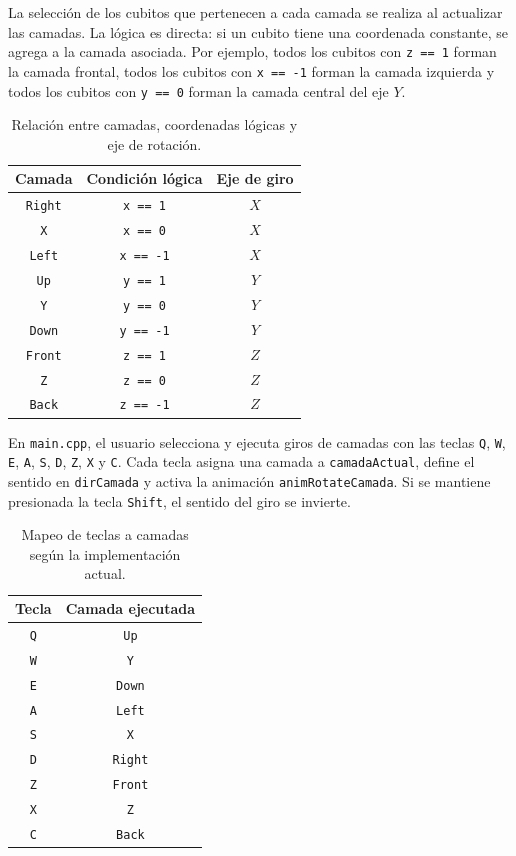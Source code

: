 \documentclass[12pt,a4paper]{article}
\begin{document}
La selección de los cubitos que pertenecen a cada camada se realiza al actualizar las camadas. La lógica es directa: si un cubito tiene una coordenada constante, se agrega a la camada asociada. Por ejemplo, todos los cubitos con \texttt{z == 1} forman la camada frontal, todos los cubitos con \texttt{x == -1} forman la camada izquierda y todos los cubitos con \texttt{y == 0} forman la camada central del eje $Y$.

\begin{table}[H]
\centering
\begin{tabular}{|c|c|c|}
\hline
\textbf{Camada} & \textbf{Condición lógica} & \textbf{Eje de giro} \\ \hline
\texttt{Right} & \texttt{x == 1} & $X$ \\ \hline
\texttt{X} & \texttt{x == 0} & $X$ \\ \hline
\texttt{Left} & \texttt{x == -1} & $X$ \\ \hline
\texttt{Up} & \texttt{y == 1} & $Y$ \\ \hline
\texttt{Y} & \texttt{y == 0} & $Y$ \\ \hline
\texttt{Down} & \texttt{y == -1} & $Y$ \\ \hline
\texttt{Front} & \texttt{z == 1} & $Z$ \\ \hline
\texttt{Z} & \texttt{z == 0} & $Z$ \\ \hline
\texttt{Back} & \texttt{z == -1} & $Z$ \\ \hline
\end{tabular}
\caption{Relación entre camadas, coordenadas lógicas y eje de rotación.}
\end{table}

En \texttt{main.cpp}, el usuario selecciona y ejecuta giros de camadas con las teclas \texttt{Q}, \texttt{W}, \texttt{E}, \texttt{A}, \texttt{S}, \texttt{D}, \texttt{Z}, \texttt{X} y \texttt{C}. Cada tecla asigna una camada a \texttt{camadaActual}, define el sentido en \texttt{dirCamada} y activa la animación \texttt{animRotateCamada}. Si se mantiene presionada la tecla \texttt{Shift}, el sentido del giro se invierte.

\begin{table}[H]
\centering
\begin{tabular}{|c|c|}
\hline
\textbf{Tecla} & \textbf{Camada ejecutada} \\ \hline
\texttt{Q} & \texttt{Up} \\ \hline
\texttt{W} & \texttt{Y} \\ \hline
\texttt{E} & \texttt{Down} \\ \hline
\texttt{A} & \texttt{Left} \\ \hline
\texttt{S} & \texttt{X} \\ \hline
\texttt{D} & \texttt{Right} \\ \hline
\texttt{Z} & \texttt{Front} \\ \hline
\texttt{X} & \texttt{Z} \\ \hline
\texttt{C} & \texttt{Back} \\ \hline
\end{tabular}
\caption{Mapeo de teclas a camadas según la implementación actual.}
\end{table}
\end{document}
